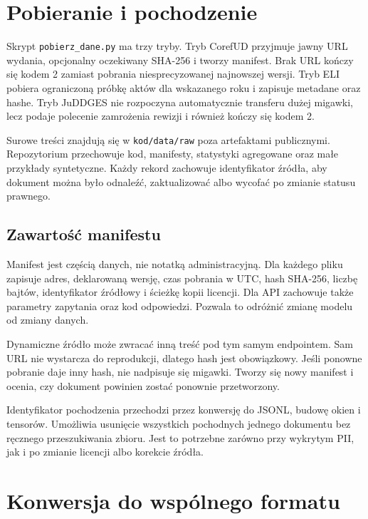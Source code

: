 \section{Pobieranie i pochodzenie}
\label{sec:pobieranie-danych}

Skrypt \texttt{pobierz\_dane.py} ma trzy tryby. Tryb CorefUD przyjmuje jawny URL wydania, opcjonalny oczekiwany SHA-256 i tworzy manifest. Brak URL kończy się kodem 2 zamiast pobrania niesprecyzowanej najnowszej wersji. Tryb ELI pobiera ograniczoną próbkę aktów dla wskazanego roku i zapisuje metadane oraz hashe. Tryb JuDDGES nie rozpoczyna automatycznie transferu dużej migawki, lecz podaje polecenie zamrożenia rewizji i również kończy się kodem 2.

Surowe treści znajdują się w \texttt{kod/data/raw} poza artefaktami publicznymi. Repozytorium przechowuje kod, manifesty, statystyki agregowane oraz małe przykłady syntetyczne. Każdy rekord zachowuje identyfikator źródła, aby dokument można było odnaleźć, zaktualizować albo wycofać po zmianie statusu prawnego.

\subsection{Zawartość manifestu}

Manifest jest częścią danych, nie notatką administracyjną. Dla każdego pliku zapisuje adres, deklarowaną wersję, czas pobrania w UTC, hash SHA-256, liczbę bajtów, identyfikator źródłowy i ścieżkę kopii licencji. Dla API zachowuje także parametry zapytania oraz kod odpowiedzi. Pozwala to odróżnić zmianę modelu od zmiany danych.

Dynamiczne źródło może zwracać inną treść pod tym samym endpointem. Sam URL nie wystarcza do reprodukcji, dlatego hash jest obowiązkowy. Jeśli ponowne pobranie daje inny hash, nie nadpisuje się migawki. Tworzy się nowy manifest i ocenia, czy dokument powinien zostać ponownie przetworzony.

Identyfikator pochodzenia przechodzi przez konwersję do JSONL, budowę okien i tensorów. Umożliwia usunięcie wszystkich pochodnych jednego dokumentu bez ręcznego przeszukiwania zbioru. Jest to potrzebne zarówno przy wykrytym PII, jak i po zmianie licencji albo korekcie źródła.

\section{Konwersja do wspólnego formatu}
\label{sec:konwersja-danych}

